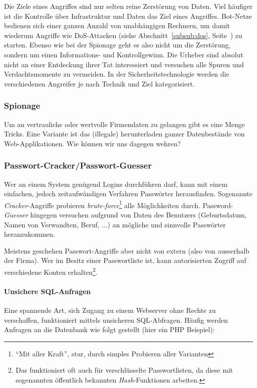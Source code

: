 Die Ziele eines Angriffes sind nur selten reine Zerstörung von Daten. Viel
häufiger ist die Kontrolle über Infrastruktur und Daten das Ziel eines
Angriffes. Bot-Netze bedienen sich einer ganzen Anzahl von unabhängigen
Rechnern, um damit wiederum Angriffe wie DoS-Attacken (siehe Abschnitt~\ref{subsub:dos},
Seite~\pageref{subsub:dos}) zu starten. Ebenso
wie bei der Spionage geht es also nicht um die Zerstörung, sondern um
einen Informations- und Kontrollgewinn. Die Urheber sind absolut nicht
an einer Entdeckung ihrer Tat interessiert und versuchen alle Spuren und
Verdachtsmomente zu vermeiden. In der Sicherheitstechnologie werden die
verschiedenen Angreifer je nach Technik und Ziel kategorisiert.

\subsubsection*{Spionage}

Um an vertrauliche oder wertvolle Firmendaten zu gelangen gibt es eine Menge
Tricks. Eine Variante ist das (illegale) herunterladen ganzer Datenbestände
von Web-Applikationen. Wie können wir uns dagegen wehren?

\subsubsection*{Passwort-Cracker/Passwort-Guesser}
\label{subsubsec:password-cracker}

Wer an einem System genügend Logins durchführen darf, kann mit einem einfachen,
jedoch zeitaufwändigen Verfahren Passwörter herausfinden. Sogenannte
\emph{Cracker}-Angriffe probieren \emph{brute-force}\footnote{``Mit aller Kraft'',
stur, durch simples Probieren aller Varianten}
alle Möglichkeiten durch. Password-\emph{Guesser} hingegen versuchen aufgrund
von Daten des Benutzers (Geburtsdatum, Namen von Verwandten, Beruf, $\ldots$)
an mögliche und sinnvolle Passwörter heranzukommen.

Meistens geschehen Passwort-Angriffe aber nicht von extern (also von ausserhalb
der Firma). Wer im Besitz einer Passwortliste ist, kann autorisierten Zugriff
auf verschiedene Konten erhalten\footnote{Das funktioniert oft auch für
verschlüsselte Passwortlisten, da diese mit sogenannten öffentlich bekannten
\emph{Hash}-Funktionen arbeiten.}.

\paragraph*{Unsichere SQL-Anfragen}
Eine spannende Art, sich Zugang zu einem Webserver ohne Rechte zu verschaffen,
funktioniert mittels unsicheren SQL-Abfragen. Häufig werden Anfragen an die
Datenbank wie folgt gestellt (hier ein PHP Beispiel):

